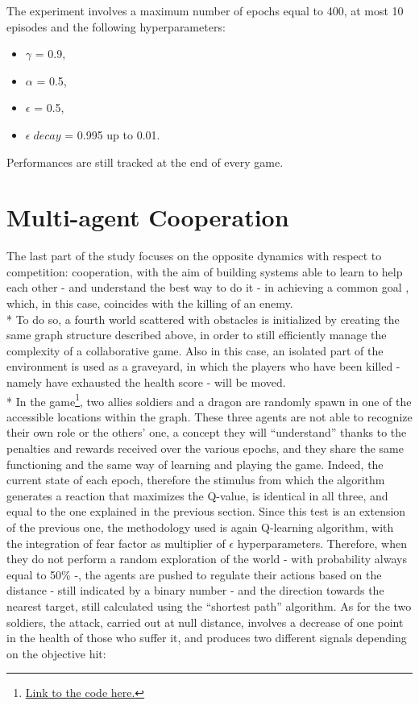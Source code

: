 The experiment involves a maximum number of epochs equal to 400,
at most 10 episodes and the following hyperparameters:
\begin{itemize}[noitemsep, topsep=0ex]
  \item $\gamma$ = 0.9,
  \item $\alpha$ = 0.5,
  \item $\epsilon$ = 0.5,
  \item $\epsilon\;decay$ = 0.995 up to 0.01.
\end{itemize}
Performances are still tracked at the end of every game.

\section{Multi-agent Cooperation}
The last part of the study focuses on the opposite dynamics with respect to competition: cooperation, with the aim of building systems able to learn to help each other - and understand the best way to do it - in achieving a common goal , which, in this case, coincides with the killing of an enemy.\\*
To do so, a fourth world scattered with obstacles is initialized by creating the same graph structure described above, in order to still efficiently manage the complexity of a collaborative game. Also in this case, an isolated part of the environment is used as a graveyard, in which the players who have been killed - namely have exhausted the health score - will be moved.\\*
In the game\footnote{\href{https://github.com/moiraghif/DragonHunting/tree/master/TeamWork}{Link to the code here.}}, two allies soldiers and a dragon are randomly spawn in one of the accessible locations within the graph. These three agents are not able to recognize their own role or the others' one, a concept they will ``understand'' thanks to the penalties and rewards received over the various epochs, and they share the same functioning and the same way of learning and playing the game. Indeed, the current state of each epoch, therefore the stimulus from which the algorithm generates a reaction that maximizes the Q-value, is identical in all three, and equal to the one explained in the previous section. Since this test is an extension of the previous one, the methodology used is again Q-learning algorithm, with the integration of fear factor as multiplier of $\epsilon$ hyperparameters. Therefore, when they do not perform a random exploration of the world - with probability always equal to 50\% -, the agents are pushed to regulate their actions based on the distance - still indicated by a binary number - and the direction towards the nearest target, still calculated using the ``shortest path'' algorithm. As for the two soldiers, the attack, carried out at null distance, involves a decrease of one point in the health of those who suffer it, and produces two different signals depending on the objective hit:
